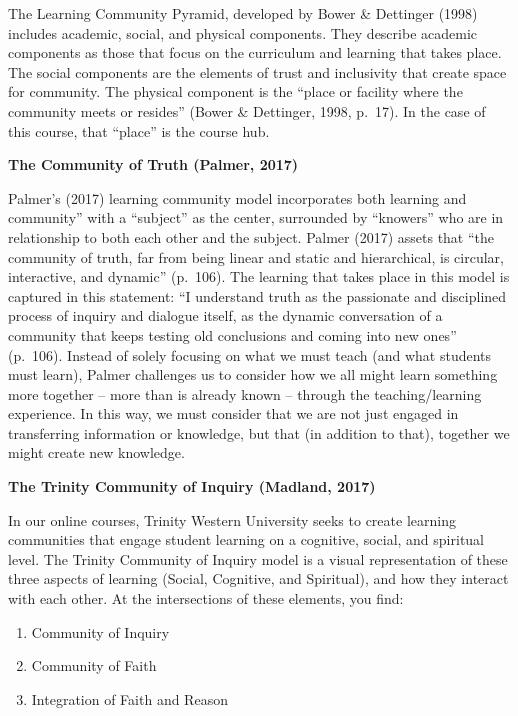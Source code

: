 \documentclass[
]{book}
\providecommand{\tightlist}{%
  \setlength{\itemsep}{0pt}\setlength{\parskip}{0pt}}
\begin{document}
The Learning Community Pyramid, developed by Bower \& Dettinger (1998) includes academic, social, and physical components. They describe academic components as those that focus on the curriculum and learning that takes place. The social components are the elements of trust and inclusivity that create space for community. The physical component is the ``place or facility where the community meets or resides'' (Bower \& Dettinger, 1998, p.~17). In the case of this course, that ``place'' is the course hub.

\textbf{The Community of Truth (Palmer, 2017)}

Palmer's (2017) learning community model incorporates both learning and community'' with a ``subject'' as the center, surrounded by ``knowers'' who are in relationship to both each other and the subject. Palmer (2017) assets that ``the community of truth, far from being linear and static and hierarchical, is circular, interactive, and dynamic'' (p.~106). The learning that takes place in this model is captured in this statement: ``I understand truth as the passionate and disciplined process of inquiry and dialogue itself, as the dynamic conversation of a community that keeps testing old conclusions and coming into new ones'' (p.~106). Instead of solely focusing on what we must teach (and what students must learn), Palmer challenges us to consider how we all might learn something more together -- more than is already known -- through the teaching/learning experience. In this way, we must consider that we are not just engaged in transferring information or knowledge, but that (in addition to that), together we might create new knowledge.

\textbf{The Trinity Community of Inquiry (Madland, 2017)}

In our online courses, Trinity Western University seeks to create learning communities that engage student learning on a cognitive, social, and spiritual level. The Trinity Community of Inquiry model is a visual representation of these three aspects of learning (Social, Cognitive, and Spiritual), and how they interact with each other. At the intersections of these elements, you find:

\begin{enumerate}
\def\labelenumi{\arabic{enumi}.}
\tightlist
\item
  Community of Inquiry\\
\item
  Community of Faith\\
\item
  Integration of Faith and Reason
\end{enumerate}
\end{document}
